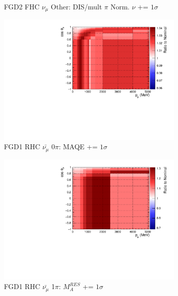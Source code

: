 \begin{figure}
\begin{subfigure}{.32\textwidth}
  \caption{FGD2 FHC $\nu_{\mu}$ Other: DIS/mult $\pi$ Norm. $\nu$ += $1\sigma$}
  \label{fig:sigvar_FGD2_numuCC_other}
\end{subfigure}
\centering
\begin{subfigure}{.32\textwidth}
  \centering
  \includegraphics[width=0.85\linewidth]{figs/sig/FGD1_anti-numuCC_0pi_MAQE_+1sig.pdf}
  \caption{FGD1 RHC $\bar{\nu_{\mu}}$ 0$\pi$: MAQE += $1\sigma$}
  \label{fig:sigvar_FGD1_anti-numuCC_0pi}
\end{subfigure}
\begin{subfigure}{.32\textwidth}
  \centering
  \includegraphics[width=0.85\linewidth]{figs/sig/FGD1_anti-numuCC_1pi_MARES_+1sig.pdf}
  \caption{FGD1 RHC $\bar{\nu_{\mu}}$ 1$\pi$: $M^{RES}_{A}$ += $1\sigma$}
  \label{fig:sigvar_FGD1_anti-numuCC_1pi}
\end{subfigure}
\begin{subfigure}{.32\textwidth}
  \centering

\end{subfigure}
\end{figure}
